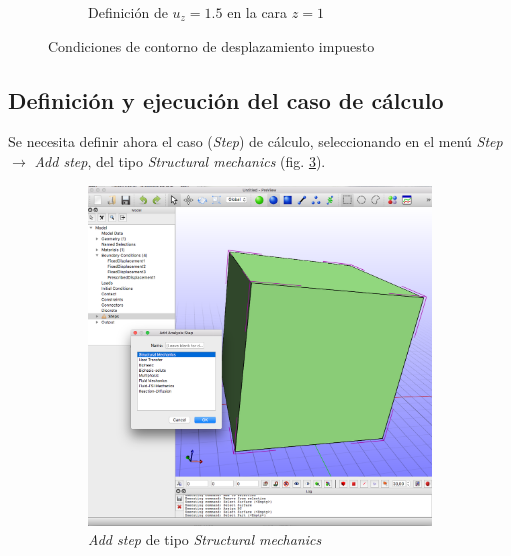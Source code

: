 \begin{figure}[!htp]
\begin{subfigure}[b]{0.48\textwidth}
\caption{Definición de $u_{z}=1.5$ en la cara $z=1$}
\label{fig:pre-11}
\end{subfigure}
\caption{Condiciones de contorno de desplazamiento impuesto}
\label{fig:pre-10-11}
\end{figure}

\subsection{Definición y ejecución del caso de cálculo}

Se necesita definir ahora el caso  (\emph{Step}) de cálculo, seleccionando en el menú \emph{Step} $\to$ \emph{Add step}, del tipo \emph{Structural mechanics} (fig. \ref{fig:pre-12}).
\begin{figure}[!htp]
\centering
\begin{subfigure}[b]{0.48\textwidth}
\centering
\includegraphics[width=\textwidth]{figuras_3/scr-pre-12.png}
\caption{\emph{Add step} de tipo \emph{Structural mechanics}}
\label{fig:pre-12}
\end{subfigure}
\begin{subfigure}[b]{0.48\textwidth}

\end{subfigure}
\end{figure}

